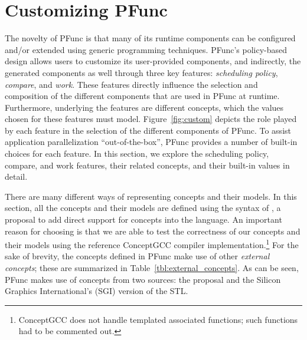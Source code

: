 \section{Customizing PFunc} 
\label{sec:custom}

The novelty of PFunc is that many of its runtime components can be configured
and/or extended using generic programming techniques.
%
PFunc's policy-based design allows users to customize its
user-provided components, and indirectly, the generated components as well
through three key features: \emph{scheduling policy}, \emph{compare}, and
\emph{work}.
%
These features directly influence the selection and composition of the
different components that are used in PFunc at runtime.
%
Furthermore, underlying the features are different concepts, which the values
chosen for these features must model.
%
Figure~\ref{fig:custom} depicts the role played by each feature in the
selection of the different components of PFunc.
%
To assist application parallelization ``out-of-the-box'', PFunc provides a 
number of built-in choices for each feature.
%
In this section, we explore the scheduling policy, compare, and work features,
their related concepts, and their built-in values in detail.

There are many different ways of representing concepts and their models.
%
In this section, all the concepts and their models are defined using the syntax
of \ConceptCpp{}, a proposal to add direct support for concepts into the \Cpp{}
language.
%
An important reason for choosing \ConceptCpp{} is that we are able to test the
correctness of our concepts and their models using the reference ConceptGCC
compiler implementation.\footnote{ConceptGCC does not handle templated
associated functions; such functions had to be commented out.}
%
For the sake of brevity, the concepts defined in PFunc make use of other
\emph{external concepts}; these are summarized in
Table~\ref{tbl:external_concepts}.
%
As can be seen, PFunc makes use of concepts from two sources: the \ConceptCpp{}
proposal and the Silicon Graphics International's (SGI) version of the STL.

